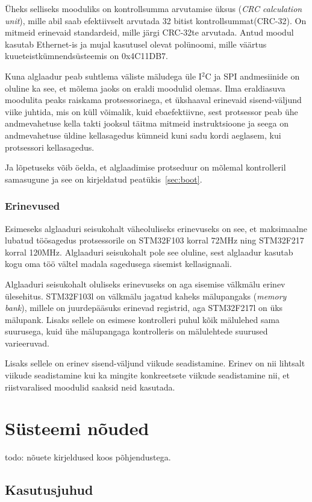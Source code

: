 \documentclass[12pt,a4paper]{article}
\newcommand{\iic}{I\({}^2\)C }
\begin{document}
Üheks selliseks mooduliks on kontrollsumma arvutamise üksus (\textit{CRC
calculation unit}), mille abil saab efektiivselt arvutada 32 bitist
kontrollsummat(CRC-32). On mitmeid erinevaid standardeid, mille järgi CRC-32te
arvutada. Antud moodul kasutab Ethernet-is ja mujal kasutusel olevat polünoomi,
mille väärtus kuueteistkümnendsüsteemis on 0x4C11DB7. 

Kuna alglaadur peab suhtlema väliste mäludega üle \iic ja SPI andmesiinide on
oluline ka see, et mõlema jaoks on eraldi moodulid olemas. Ilma eraldiasuva
moodulita peaks raiskama protsessoriaega, et ükshaaval erinevaid sisend-väljund
viike juhtida, mis on küll võimalik, kuid ebaefektiivne, sest protsessor peab
ühe andmevahetuse kella takti jooksul täitma mitmeid instruktsioone ja seega
on andmevahetuse üldine kellasagedus kümneid kuni sadu kordi aeglasem, kui
protsessori kellasagedus.

Ja lõpetuseks võib öelda, et alglaadimise protseduur on mõlemal kontrolleril
samasugune ja see on kirjeldatud peatükis~\ref{sec:boot}.

\subsubsection{Erinevused}
Esimeseks alglaaduri seisukohalt väheoluliseks erinevuseks on see, et
maksimaalne lubatud töösagedus protsessorile on STM32F103 korral 72MHz ning
STM32F217 korral 120MHz. Alglaaduri seisukohalt pole see oluline, sest alglaadur
kasutab kogu oma töö vältel madala sagedusega sisemist kellasignaali.

Alglaaduri seisukohalt oluliseks erinevuseks on aga sisemise välkmälu erinev
ülesehitus. STM32F103l on välkmälu jagatud kaheks mälupangaks (\textit{memory
bank}), millele on juurdepääsuks erinevad registrid, aga STM32F217l on üks
mälupank. Lisaks sellele on esimese kontrolleri puhul kõik mälulehed sama
suurusega, kuid ühe mälupangaga kontrolleris on mälulehtede suurused
varieeruvad. \cite{f1fpm,f2fpm}

Lisaks sellele on erinev sisend-väljund viikude seadistamine. Erinev on nii
lihtsalt viikude seadistamine kui ka mingite konkreetsete viikude seadistamine
nii, et riistvaralised moodulid saaksid neid kasutada.

\section{Süsteemi nõuded}
todo: nõuete kirjeldused koos põhjendustega.
\subsection{Kasutusjuhud}
\end{document}
